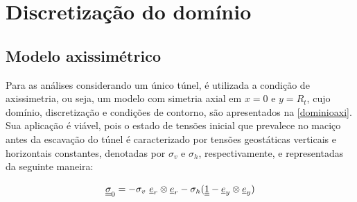 %
%
%
%
\chapter{Discretização do domínio}


\section{Modelo axissimétrico}

Para as análises considerando um único túnel, é utilizada a condição de axissimetria, ou seja, um modelo com simetria axial em $x=0$ e $y=R_t$, cujo domínio, discretização e condições de contorno, são apresentados na \autoref{dominioaxi}. Sua aplicação é viável, pois o estado de tensões inicial que prevalece no maciço antes da escavação do túnel é caracterizado por tensões geostáticas verticais e horizontais constantes, denotadas por $\sigma_v$ e $\sigma_h$, respectivamente, e representadas da seguinte maneira:

\begin{equation}
	\underline{\underline \sigma}_0 = -\sigma_v ~ \underline{e}_r \otimes \underline{e}_r - \sigma_h (\underline{\underline 1} - \underline{e}_y \otimes \underline{e}_y)
\end{equation}

